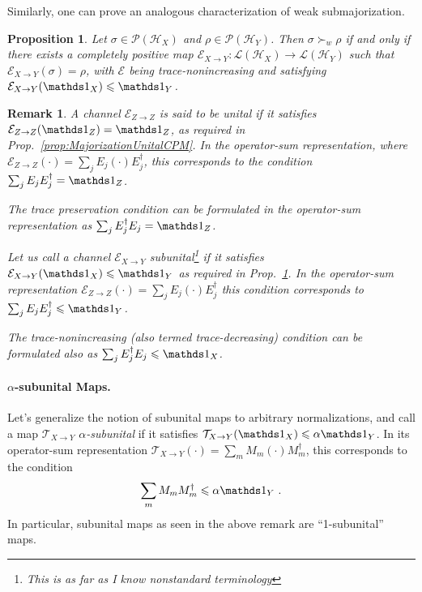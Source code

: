 \documentclass[11pt,a4paper]{article}
\theoremstyle{plain}
\newtheorem{prop}[thm]{Proposition}
\newtheorem{remark}[thm]{Remark}
\def\Hs{\mathscr{H}}%
\newcommand{\LOps}{\mathscr{L}}
\newcommand{\POps}{\mathscr{P}}
\begin{document}
Similarly, one can prove an analogous characterization of weak submajorization.
\begin{prop}
  \label{prop:WeakSubMajorizationSubUnitalCPM}
  Let $\sigma\in\POps(\Hs_X)$ and $\rho\in\POps(\Hs_Y)$. Then $\sigma\succ_w\rho$ if and only if
  there exists a completely positive map $\mathcal{E}_{X\rightarrow Y} : \LOps(\Hs_X)\rightarrow\LOps(\Hs_Y)$
  such that $\mathcal{E}_{X\rightarrow Y}(\sigma) = \rho$, with $\mathcal{E}$ being trace-nonincreasing and
  satisfying $\mathcal{E}_{X\rightarrow Y}(\Ident_X)\leqslant \Ident_Y$.
\end{prop}

\begin{remark}
  \label{rem:AboutUnitalCPMs}
  A channel $\mathcal{E}_{Z\rightarrow Z}$ is said to be {\em unital} if it satisfies
  $\mathcal{E}_{Z\rightarrow Z}(\Ident_Z) = \Ident_Z$, as required in Prop.~\ref{prop:MajorizationUnitalCPM}. In
  the operator-sum representation, where
  $\mathcal{E}_{Z\rightarrow Z}(\cdot) = \sum_j E_j\left(\cdot\right)E_j^\dagger$, this corresponds to the condition
  $\sum_j E_j E_j^\dagger = \Ident_Z$.

  The trace preservation condition can be formulated in the operator-sum representation as
  $\sum_j E_j^\dagger E_j = \Ident_Z$.

  Let us call a channel $\mathcal{E}_{X\rightarrow Y}$ {\em subunital}\footnote{This is as far as I know
    nonstandard terminology} if it satisfies $\mathcal{E}_{X\rightarrow Y}(\Ident_X) \leqslant \Ident_Y$ as
  required in Prop.~\ref{prop:WeakSubMajorizationSubUnitalCPM}. In the operator-sum representation
  $\mathcal{E}_{Z\rightarrow Z}(\cdot) = \sum_j E_j\left(\cdot\right)E_j^\dagger$ this condition corresponds
  to $\sum_j E_j E_j^\dagger \leqslant \Ident_Y$.

  The trace-nonincreasing (also termed trace-decreasing) condition can be formulated also as
  $\sum_j E_j^\dagger E_j \leqslant \Ident_X$.
\end{remark}

\paragraph{$\alpha$-subunital Maps.} Let's generalize the notion of subunital maps to arbitrary normalizations,
and call a map $\mathcal{T}_{X\rightarrow Y}$ {\em $\alpha$-subunital} if it satisfies
$\mathcal{T}_{X\rightarrow Y}(\Ident_X) \leqslant \alpha \Ident_Y$. In its operator-sum representation
$\mathcal{T}_{X\rightarrow Y}(\cdot) = \sum_m M_m \left(\cdot\right) M_m^\dagger$, this corresponds to the
condition
\begin{align}
  \label{eq:lambdaSubUnital}
  \sum_m M_m M_m^\dagger \leqslant \alpha \Ident_Y\ .
\end{align}
In particular, subunital maps as seen in the above remark are ``1-subunital'' maps.
\end{document}
